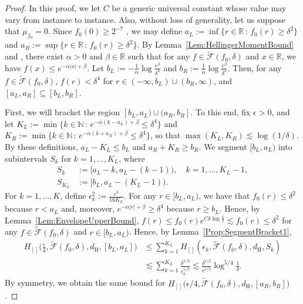 \documentclass[a4paper,12pt]{article}
\begin{document}
\begin{proof} 
  In this proof, we let $C$ be a generic universal constant whose value may vary from instance to instance. Also, without loss of generality, let us suppose that $\mu_{f_0}=0$.  Since $f_0(0) \geq 2^{-7}$ \citep[][Theorem~5.14(d)]{lovasz2007geometry}, we may define $a_L := \inf \{ r \in \mathbb{R} \,:\, f_0(r) \geq \delta^2\}$ and $a_R := \sup \{ r \in \mathbb{R}\,:\, f_0(r) \geq \delta^2\}$. By Lemma~\ref{Lem:HellingerMomentBound} and \citet[][Lemma~13]{fresen2013multivariate}, there exist $\alpha > 0$ and $\beta \in \mathbb{R}$ such that for any $f \in \tilde{\mathcal{F}}(f_0, \delta)$ and $x \in \mathbb{R}$, we have $f(x) \leq e^{-\alpha |x| + \beta}$.  Let $b_L := - \frac{1}{\alpha} \log \frac{e^\beta}{\delta^4}$ and $b_R := \frac{1}{\alpha} \log \frac{e^\beta}{\delta^4}$.  Then, for any $f \in \tilde{\mathcal{F}}(f_0, \delta)$, $f(r) < \delta^4$ for $r \in (-\infty,b_L) \cup (b_R,\infty)$, and $[a_L, a_R] \subseteq [b_L, b_R]$.

First, we will bracket the region $[b_L, a_L) \cup (a_R, b_R]$.  To this end, fix $\epsilon > 0$, and let $K_L := \min \{ k \in \mathbb{N}\,:\, e^{- \alpha ( k - a_L) + \beta} \leq \delta^4 \}$ and $K_R := \min \{ k \in \mathbb{N}\,:\, e^{ - \alpha ( k + a_R)+\beta} \leq \delta^4\}$, so that $\max(K_L,K_R) \lesssim \log(1/\delta)$.  By these definitions, $a_L - K_L \leq b_L$ and $a_R + K_R \geq b_R$. We segment $[b_L, a_L)$ into subintervals $S_k$ for $k=1,\ldots,K_L$, where
\begin{align*}
  S_k &:= \bigl[a_L - k, a_L - (k-1)\bigr),  \quad k=1,\ldots,K_L-1, \\
  S_{K_L} &:= \bigl[b_L, a_L - (K_L - 1)\bigr).
\end{align*}
For $k=1,\ldots,K$, define $\epsilon^2_k := \frac{\epsilon^2}{16 K_L}$.  For any $r \in [b_L,a_L)$, we have that $f_0(r) \leq \delta^2$ because $r < a_L$ and, moreover, $e^{-\alpha|r|+\beta} \geq \delta^4$ because $r \geq b_L$. Hence, by Lemma~\ref{Lem:EnvelopeUpperBound}, $f(r) \leq f_0(r) e^{ C \delta \log \frac{1}{\delta}} \lesssim f_0(r) \leq \delta^2$ for any $f \in \tilde{\mathcal{F}}(f_0, \delta)$ and $r \in [b_L,a_L)$.  Hence, by Lemma~\ref{Prop:SegmentBracket1}, 
  \begin{align}
\label{Eq:bLaL}
    H_{[]}\biggl(\frac{\epsilon}{4}, \tilde{\mathcal{F}}(f_0, \delta), d_{\mathrm{H}}, [b_L, a_L]\biggr)
    &\leq  \sum_{k=1}^{K_L}
    H_{[]}(\epsilon_k, \tilde{\mathcal{F}}(f_0, \delta), d_{\mathrm{H}}, S_k) \nonumber \\
    & \lesssim \sum_{k=1}^{K_L} \frac{\delta^{1/2}}{\epsilon_k^{1/2}} \lesssim \frac{\delta^{1/2}}{\epsilon^{1/2}} \log^{5/4} \frac{1}{\delta}.
  \end{align}
By symmetry, we obtain the same bound for $H_{[]}\bigl(\epsilon/4, \tilde{\mathcal{F}}(f_0, \delta), d_{\mathrm{H}}, [a_R, b_R]\bigr)$.
  

\end{proof}
\end{document}
